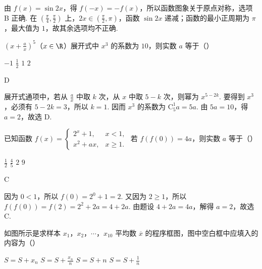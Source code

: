 \begin{solution}
由 \(f(x)=\sin2x\)，得 \(f(-x)=-f(x)\)，所以函数图象关于原点对称，选项 B 正确. 在 \(\left(\frac{\pi}{4},\frac{\pi}{2}\right)\) 上，\(2x\in\left(\frac{\pi}{2},\pi\right)\)，函数 \(\sin2x\) 递减；函数的最小正周期为 \(\pi\)，最大值为 \(1\)，故其余选项均不正确.
\end{solution}

\begin{problem}
\(\left(x + \frac{a}{x}\right)^5\)（\(x\in \R\)）展开式中 \(x^{3}\) 的系数为 \(10\)，则实数 \(a\) 等于（\quad）

\choices
    {\(-1\)}
    {\(\frac{1}{2}\)}
    {\(1\)}
    {\(2\)}
\end{problem}

\begin{answer}
D
\end{answer}

\begin{solution}
展开式通项中，若从 \(\frac{a}{x}\) 中取 \(k\) 次，从 \(x\) 中取 \(5-k\) 次，则幂为 \(x^{5-2k}\). 要得到 \(x^3\)，必须有 \(5-2k=3\)，所以 \(k=1\). 因而 \(x^3\) 的系数为 \(\mathrm C_5^1a=5a\). 由 \(5a=10\)，得 \(a=2\)，故选 D.
\end{solution}

\begin{problem}
已知函数 \(f(x) = \begin{cases}
2^x + 1, & x < 1,\\
x^2 + ax, & x \geqslant 1.
\end{cases}\) 若 \(f(f(0)) = 4a\)，则实数 \(a\) 等于（\quad）

\choices
    {\(\frac{1}{2}\)}
    {\(\frac{4}{5}\)}
    {\(2\)}
    {\(9\)}
\end{problem}

\begin{answer}
C
\end{answer}

\begin{solution}
因为 \(0<1\)，所以 \(f(0)=2^0+1=2\). 又因为 \(2\geqslant1\)，所以 \(f(f(0))=f(2)=2^2+2a=4+2a\). 由题设 \(4+2a=4a\)，解得 \(a=2\)，故选 C.
\end{solution}

\begin{problem}
如图所示是求样本 \(x_{1}\)，\(x_{2}\)，\(\cdots\)，\(x_{10}\) 平均数 \(\overline{x}\) 的程序框图，图中空白框中应填入的内容为（\quad）


\choices
    {\(S = S + x_{n}\)}
    {\(S = S + \frac{x_n}{n}\)}
    {\(S = S + n\)}
    {\(S = S + \frac{1}{n}\)}
\end{problem}

